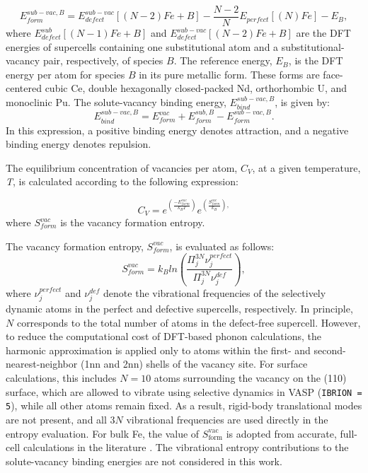 \documentclass[preprint,12pt]{elsarticle}
\begin{document}
\begin{equation}
\label{eq_Ef_vac_sub}
    E_{form}^{sub-vac,B} = E_{defect}^{sub-vac}[(N-2)Fe + B] - \frac{N-2}{N}E_{perfect}[(N) Fe] - E_{B},
\end{equation}
where $E_{defect}^{sub}[(N-1)Fe + B]$ and $E_{defect}^{sub-vac}[(N-2)Fe + B]$ are the DFT energies of supercells containing one substitutional atom and a substitutional-vacancy pair, respectively, of species $B$. The reference energy, $E_{B}$, is the DFT energy per atom for species $B$ in its pure metallic form. These forms are face-centered cubic Ce, double hexagonally closed-packed Nd, orthorhombic U, and monoclinic Pu. The solute-vacancy binding energy, $E_{bind}^{sub-vac,B}$, is given by:
\begin{equation}
\label{eq_Eb}
    E_{bind}^{sub-vac,B} = E_{form}^{vac} + E_{form}^{sub,B} - E_{form}^{sub-vac,B}.
\end{equation}
In this expression, a positive binding energy denotes attraction, and a negative binding energy denotes repulsion. 

The equilibrium concentration of vacancies per atom, $C_V$, at a given temperature, \textit{T}, is calculated according to the following expression:

\begin{equation}
\label{eq:conc_vac}
    C_V = e^{(\frac{-E_{form}^{vac}}{k_B T})} e^{(\frac{S_{form}^{vac}}{k_B}),}
\end{equation}
where $S_{form}^{vac}$ is the vacancy formation entropy. 

The vacancy formation entropy, $S_{form}^{vac}$, is evaluated as follows:
\begin{equation}
    S_{form}^{vac} = k_B ln\left(\frac{\Pi^{3N}_j \nu_j^{perfect}}{\Pi^{3N}_j \nu_j^{def}}\right),
\label{eq_entropy}
\end{equation}
where $\nu_j^{perfect}$ and $\nu_j^{def}$ denote the vibrational frequencies of the selectively dynamic atoms in the perfect and defective supercells, respectively. In principle, $N$ corresponds to the total number of atoms in the defect-free supercell. However, to reduce the computational cost of DFT-based phonon calculations, the harmonic approximation is applied only to atoms within the first- and second-nearest-neighbor (1nn and 2nn) shells of the vacancy site. For surface calculations, this includes $N = 10$ atoms surrounding the vacancy on the (110) surface, which are allowed to vibrate using selective dynamics in VASP (\texttt{IBRION = 5}), while all other atoms remain fixed. As a result, rigid-body translational modes are not present, and all $3N$ vibrational frequencies are used directly in the entropy evaluation. For bulk Fe, the value of $S_{\text{form}}^{\text{vac}}$ is adopted from accurate, full-cell calculations in the literature \cite{messina_systematic_2016}. The vibrational entropy contributions to the solute-vacancy binding energies are not considered in this work.
\end{document}
